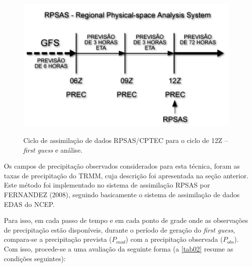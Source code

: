 \begin{figure}
\centering
\includegraphics[height=7.5cm]{./figs/rpsas.png}
\caption{Ciclo de assimilação de dados RPSAS/CPTEC para o ciclo de 12Z – \textit{first guess} e análise.}
\label{fig09}
\end{figure}

Os campos de precipitação observados considerados para esta técnica, foram as taxas de precipitação do TRMM, cuja descrição foi apresentada na seção anterior. Este método foi implementado no sistema de assimilação RPSAS por FERNANDEZ (2008), seguindo basicamente o sistema de assimilação de dados EDAS do NCEP.

Para isso, em cada passo de tempo e em cada ponto de grade onde as observações de precipitação estão disponíveis, durante o período de geração do \textit{first guess}, compara-se a precipitação prevista ($P_{mod}$) com a precipitação observada ($P_{obs}$). Com isso, procede-se a uma avaliação da seguinte forma (a \autoref{tab02} resume as condições seguintes):

